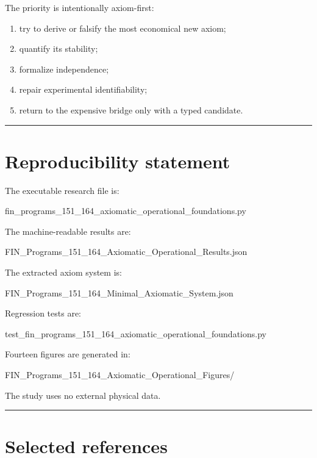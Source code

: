 \documentclass[11pt,a4paper,openany]{report}
\begin{document}
The priority is intentionally axiom-first:

\begin{enumerate}
\item 
try to derive or falsify the most economical new axiom;

\item 
quantify its stability;

\item 
formalize independence;

\item 
repair experimental identifiability;

\item 
return to the expensive bridge only with a typed candidate.

\end{enumerate}

\par\medskip\hrule\medskip

\chapter{Reproducibility statement}

The executable research file is:

fin\_programs\_151\_164\_axiomatic\_operational\_foundations.py

The machine-readable results are:

FIN\_Programs\_151\_164\_Axiomatic\_Operational\_Results.json

The extracted axiom system is:

FIN\_Programs\_151\_164\_Minimal\_Axiomatic\_System.json

Regression tests are:

test\_fin\_programs\_151\_164\_axiomatic\_operational\_foundations.py

Fourteen figures are generated in:

FIN\_Programs\_151\_164\_Axiomatic\_Operational\_Figures/\allowbreak{}

The study uses no external physical data.

\par\medskip\hrule\medskip

\chapter{Selected references}
\end{document}
